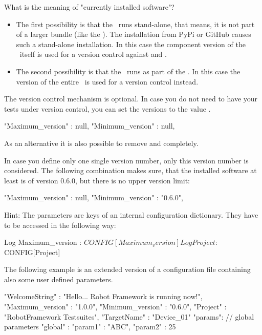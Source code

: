 What is the meaning of "currently installed software"?

\begin{itemize}
   \item The first possibility is that the \pkg\ runs stand-alone, that means, it is not part of a larger bundle (like the \rfw).
         The installation from PyPi or GitHub causes such a stand-alone installation. In this case the component version of
         the \pkg\ itself is used for a version control against  and .
   \item The second possibility is that the \pkg\ runs as part of the \rfw. In this case the version of the entire \rfw\ is used
         for a version control instead.
\end{itemize}

The version control mechanism is optional. In case you do not need to have your tests under version control, you can set
the versions to the value .

\begin{pythoncode}
"Maximum_version" : null,
"Minimum_version" : null,
\end{pythoncode}

As an alternative it is also possible to remove  and  completely.

In case you define only one single version number, only this version number is considered. The following combination
makes sure, that the installed software at least is of version 0.6.0, but there is no upper version limit:

\begin{pythoncode}
"Maximum_version" : null,
"Minimum_version" : "0.6.0",
\end{pythoncode}

Hint: The parameters are keys of an internal configuration dictionary. They have to be accessed in the following way:

\begin{robotcode}
Log    Maximum_version : ${CONFIG}[Maximum_version]
Log    Project : ${CONFIG}[Project]
\end{robotcode}

\vspace{1ex}

The following example is an extended version of a configuration file containing also some user defined parameters.

\begin{pythoncode}
{
  "WelcomeString"   : "Hello... Robot Framework is running now!",
  "Maximum_version" : "1.0.0",
  "Minimum_version" : "0.6.0",
  "Project"         : "RobotFramework Testsuites",
  "TargetName"      : "Device_01"
  "params": {
              // global parameters
              "global" : {
                           "param1" : "ABC",
                           "param2" : 25
                         }
            }
}
\end{pythoncode}

